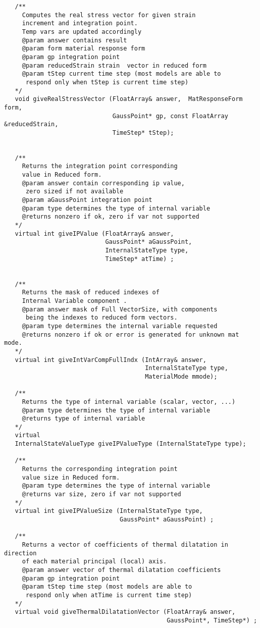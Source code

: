 \documentclass[12pt,draft]{article}
\begin{document}
{\begin{verbatim}
   /**
     Computes the real stress vector for given strain 
     increment and integration point. 
     Temp vars are updated accordingly
     @param answer contains result
     @param form material response form
     @param gp integration point 
     @param reducedStrain strain  vector in reduced form
     @param tStep current time step (most models are able to 
      respond only when tStep is current time step)
   */
   void giveRealStressVector (FloatArray& answer,  MatResponseForm form, 
                              GaussPoint* gp, const FloatArray &reducedStrain, 
                              TimeStep* tStep);


   /**
     Returns the integration point corresponding 
     value in Reduced form.
     @param answer contain corresponding ip value, 
      zero sized if not available
     @param aGaussPoint integration point
     @param type determines the type of internal variable
     @returns nonzero if ok, zero if var not supported
   */
   virtual int giveIPValue (FloatArray& answer, 
                            GaussPoint* aGaussPoint, 
                            InternalStateType type, 
                            TimeStep* atTime) ;


   /**
     Returns the mask of reduced indexes of 
     Internal Variable component .
     @param answer mask of Full VectorSize, with components 
      being the indexes to reduced form vectors.
     @param type determines the internal variable requested
     @returns nonzero if ok or error is generated for unknown mat mode.
   */
   virtual int giveIntVarCompFullIndx (IntArray& answer, 
                                       InternalStateType type, 
                                       MaterialMode mmode);

   /**
     Returns the type of internal variable (scalar, vector, ...)
     @param type determines the type of internal variable
     @returns type of internal variable
   */
   virtual 
   InternalStateValueType giveIPValueType (InternalStateType type);

   /**
     Returns the corresponding integration point  
     value size in Reduced form.
     @param type determines the type of internal variable
     @returns var size, zero if var not supported
   */
   virtual int giveIPValueSize (InternalStateType type, 
                                GaussPoint* aGaussPoint) ;

   /**
     Returns a vector of coefficients of thermal dilatation in direction
     of each material principal (local) axis.
     @param answer vector of thermal dilatation coefficients
     @param gp integration point
     @param tStep time step (most models are able to 
      respond only when atTime is current time step)
   */
   virtual void giveThermalDilatationVector (FloatArray& answer, 
                                             GaussPoint*, TimeStep*) ;




\end{verbatim}}
\end{document}
